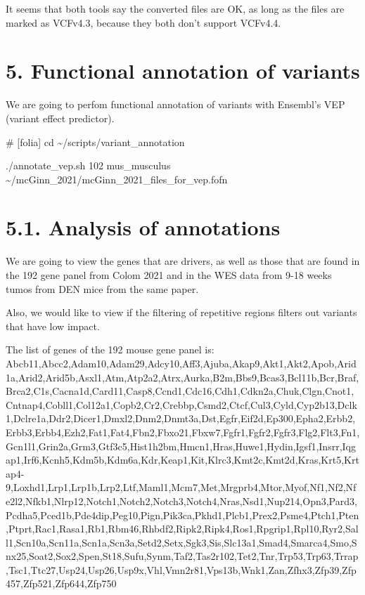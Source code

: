 \documentclass[
  letterpaper,
  DIV=11,
  numbers=noendperiod]{scrreprt}
\newenvironment{Shaded}{\begin{snugshade}}{\end{snugshade}}
\newcommand{\BuiltInTok}[1]{\textcolor[rgb]{0.00,0.23,0.31}{#1}}
\newcommand{\CommentTok}[1]{\textcolor[rgb]{0.37,0.37,0.37}{#1}}
\newcommand{\ExtensionTok}[1]{\textcolor[rgb]{0.00,0.23,0.31}{#1}}
\newcommand{\NormalTok}[1]{\textcolor[rgb]{0.00,0.23,0.31}{#1}}
\begin{document}
It seems that both tools say the converted files are OK, as long as the
files are marked as VCFv4.3, because they both don't support VCFv4.4.

\chapter{5. Functional annotation of
variants}\label{functional-annotation-of-variants}

We are going to perfom functional annotation of variants with Ensembl's
VEP (variant effect predictor).

\begin{Shaded}
\begin{Highlighting}[]
\CommentTok{\# [folia]}
\BuiltInTok{cd}\NormalTok{ \textasciitilde{}/scripts/variant\_annotation}

\ExtensionTok{./annotate\_vep.sh}\NormalTok{ 102 mus\_musculus \textasciitilde{}/mcGinn\_2021/mcGinn\_2021\_files\_for\_vep.fofn}
\end{Highlighting}
\end{Shaded}

\chapter{5.1. Analysis of annotations}\label{analysis-of-annotations}

We are going to view the genes that are drivers, as well as those that
are found in the 192 gene panel from Colom 2021 and in the WES data from
9-18 weeks tumos from DEN mice from the same paper.

Also, we would like to view if the filtering of repetitive regions
filters out variants that have low impact.

The list of genes of the 192 mouse gene panel is:
Abcb11,Abcc2,Adam10,Adam29,Adcy10,Aff3,Ajuba,Akap9,Akt1,Akt2,Apob,Arid1a,Arid2,Arid5b,Asxl1,Atm,Atp2a2,Atrx,Aurka,B2m,Bbs9,Bcas3,Bcl11b,Bcr,Braf,Brca2,C1s,Cacna1d,Card11,Casp8,Ccnd1,Cdc16,Cdh1,Cdkn2a,Chuk,Clgn,Cnot1,Cntnap4,Cobll1,Col12a1,Copb2,Cr2,Crebbp,Csmd2,Ctcf,Cul3,Cyld,Cyp2b13,Dclk1,Dclre1a,Ddr2,Dicer1,Dmxl2,Dnm2,Dnmt3a,Dst,Egfr,Eif2d,Ep300,Epha2,Erbb2,Erbb3,Erbb4,Ezh2,Fat1,Fat4,Fbn2,Fbxo21,Fbxw7,Fgfr1,Fgfr2,Fgfr3,Flg2,Flt3,Fn1,Gcn1l1,Grin2a,Grm3,Gtf3c5,Hist1h2bm,Hmcn1,Hras,Huwe1,Hydin,Igsf1,Insrr,Iqgap1,Irf6,Kcnh5,Kdm5b,Kdm6a,Kdr,Keap1,Kit,Klrc3,Kmt2c,Kmt2d,Kras,Krt5,Krtap4-9,Loxhd1,Lrp1,Lrp1b,Lrp2,Ltf,Maml1,Mcm7,Met,Mrgprb4,Mtor,Myof,Nf1,Nf2,Nfe2l2,Nfkb1,Nlrp12,Notch1,Notch2,Notch3,Notch4,Nras,Nsd1,Nup214,Opn3,Pard3,Pcdha5,Pced1b,Pde4dip,Peg10,Pign,Pik3ca,Pkhd1,Plcb1,Prex2,Psme4,Ptch1,Pten,Ptprt,Rac1,Rasa1,Rb1,Rbm46,Rhbdf2,Ripk2,Ripk4,Ros1,Rpgrip1,Rpl10,Ryr2,Sall1,Scn10a,Scn11a,Scn1a,Scn3a,Setd2,Setx,Sgk3,Sis,Slc13a1,Smad4,Smarca4,Smo,Snx25,Soat2,Sox2,Spen,St18,Sufu,Synm,Taf2,Tas2r102,Tet2,Tnr,Trp53,Trp63,Trrap,Tsc1,Ttc27,Usp24,Usp26,Usp9x,Vhl,Vmn2r81,Vps13b,Wnk1,Zan,Zfhx3,Zfp39,Zfp457,Zfp521,Zfp644,Zfp750
\end{document}
